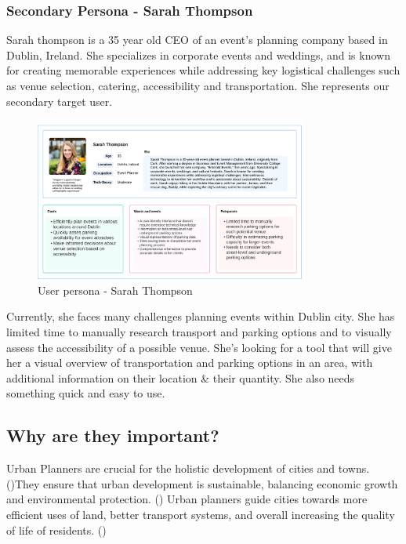 \documentclass[preview]{standalone}
\begin{document}
\subsubsection{Secondary Persona - Sarah Thompson}
Sarah thompson is a 35 year old CEO of an event's planning company based in
Dublin, Ireland. She specializes in corporate events and weddings, and is known
for creating memorable experiences while addressing key logistical challenges
such as venue selection, catering, accessibility and transportation. She
represents our secondary target user.

\begin{figure}[htbp!]
    \centering{}{}
    \includegraphics[width=0.8\textwidth]{images/sarah-thompson-userpersona.png}
    \caption{User persona - Sarah Thompson}
\end{figure}

\newpage{}

Currently, she faces many challenges planning events within Dublin city. She has
limited time to manually research transport and parking options and to visually
assess the accessibility of a possible venue. She's looking for a tool that will
give her a visual overview of transportation and parking options in an area,
with additional information on their location  \& their quantity. She also needs
something quick and easy to use.

\subsection{Why are they important?}
Urban Planners are crucial for the holistic development of cities and towns.
(\cite{jha2021review})They ensure that urban development is sustainable,
balancing economic growth and environmental protection. (\cite{lei2021urban})
Urban planners guide cities towards more efficient uses of land, better
transport systems, and overall increasing the quality of life of residents.
(\cite{janpavle2022importance})
\end{document}
